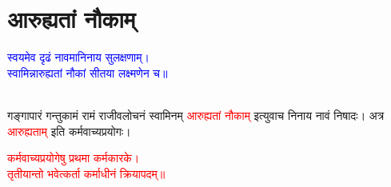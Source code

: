 \section[आरुह्यतां नौकाम्]{आरुह्यतां नौकाम्‌}
\centering\textcolor{blue}{स्वयमेव दृढं नावमानिनाय सुलक्षणाम्।\nopagebreak\\
स्वामिन्नारुह्यतां नौकां सीतया लक्ष्मणेन च॥}\nopagebreak\\
\\
\begin{sloppypar}\justifying\noindent\hspace{10mm} गङ्गा\-पारं गन्तुकामं रामं राजीव\-लोचनं स्वामिनम् \textcolor{red}{आरुह्यतां नौकाम्‌} इत्युवाच निनाय नावं निषादः। अत्र \textcolor{red}{आरुह्यताम्‌} इति कर्म\-वाच्य\-प्रयोगः।\end{sloppypar}
\centering\textcolor{red}{कर्मवाच्यप्रयोगेषु प्रथमा कर्मकारके।\nopagebreak\\
तृतीयान्तो भवेत्कर्ता कर्माधीनं क्रियापदम्॥}\nopagebreak\\
\\
